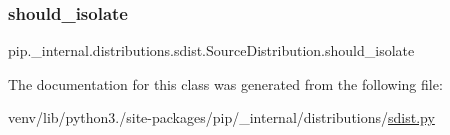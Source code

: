 \subsubsection{\texorpdfstring{should\+\_\+isolate}{should\_isolate}}
{\footnotesize\ttfamily pip.\+\_\+internal.\+distributions.\+sdist.\+Source\+Distribution.\+should\+\_\+isolate\hspace{0.3cm}{\ttfamily [static]}}



The documentation for this class was generated from the following file\+:\begin{DoxyCompactItemize}
\item 
venv/lib/python3./site-\/packages/pip/\+\_\+internal/distributions/\hyperlink{pip_2__internal_2distributions_2sdist_8py}{sdist.\+py}\end{DoxyCompactItemize}
